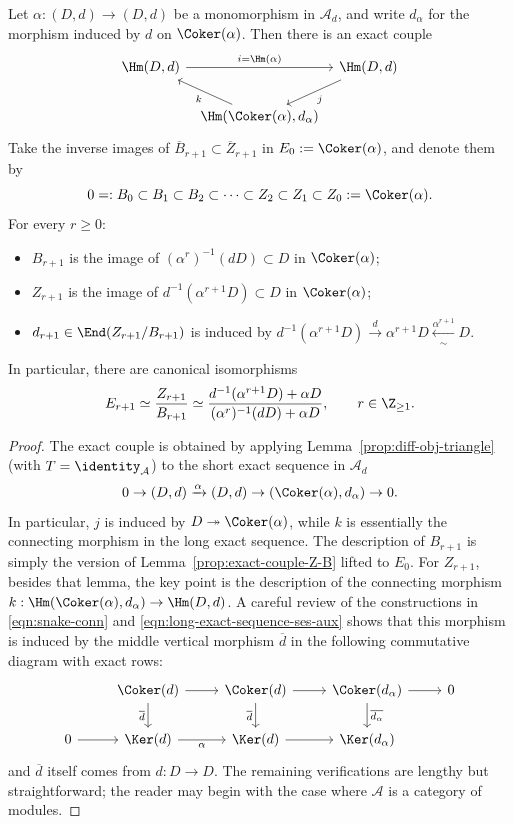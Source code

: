 \begin{proposition}\label{prop:differential-exact-couple}
	Let $\alpha:(D,d)\to(D,d)$ be a monomorphism in $\mathcal{A}_d$, and
	write $d_\alpha$ for the morphism induced by $d$ on $\Coker(\alpha)$. Then
	there is an exact couple
	\[\begin{tikzcd}[column sep=tiny]
		\Hm(D,d) \arrow[rr, "{i=\Hm(\alpha)}"] & &
		\Hm(D,d) \arrow[ld, "j"] \\
		& \Hm(\Coker(\alpha),d_\alpha) \arrow[lu, "k"] &
	\end{tikzcd}\]
	Take the inverse images of
	$\overline{B}_{r+1}\subset\overline{Z}_{r+1}$ in
	$E_0:=\Coker(\alpha)$, and denote them by
	\[ 0=:B_0\subset B_1\subset B_2\subset\cdots\subset Z_2\subset Z_1
	\subset Z_0:=\Coker(\alpha). \]
	For every $r\geq0$:
	\begin{itemize}
		\item $B_{r+1}$ is the image of
		$(\alpha^r)^{-1}(dD)\subset D$ in $\Coker(\alpha)$;
		\item $Z_{r+1}$ is the image of
		$d^{-1}(\alpha^{r+1}D)\subset D$ in $\Coker(\alpha)$;
		\item $d_{r+1}\in\End(Z_{r+1}/B_{r+1})$ is induced by
		$d^{-1}(\alpha^{r+1}D)\xrightarrow{d}\alpha^{r+1}D
		\xleftarrow[\sim]{\alpha^{r+1}}D$.
	\end{itemize}
	In particular, there are canonical isomorphisms
	\[ E_{r+1}\simeq\dfrac{Z_{r+1}}{B_{r+1}}
	\simeq\dfrac{d^{-1}(\alpha^{r+1}D)+\alpha D}
	{(\alpha^r)^{-1}(dD)+\alpha D},\qquad r\in\Z_{\geq1}. \]
\end{proposition}
\begin{proof}
	The exact couple is obtained by applying
	Lemma~\ref{prop:diff-obj-triangle} (with
	$T=\identity_{\mathcal{A}}$) to the short exact sequence in
	$\mathcal{A}_d$
	\[ 0\to(D,d)\xrightarrow{\alpha}(D,d)
	\to(\Coker(\alpha),d_\alpha)\to0. \]
	In particular, $j$ is induced by $D\twoheadrightarrow\Coker(\alpha)$,
	while $k$ is essentially the connecting morphism in the long exact
	sequence. The description of $B_{r+1}$ is simply the version of
	Lemma~\ref{prop:exact-couple-Z-B} lifted to $E_0$. For $Z_{r+1}$, besides
	that lemma, the key point is the description of the connecting morphism
	$k:\Hm(\Coker(\alpha),d_\alpha)\to\Hm(D,d)$. A careful review of the
	constructions in \eqref{eqn:snake-conn} and
	\eqref{eqn:long-exact-sequence-ses-aux} shows that this morphism is induced
	by the middle vertical morphism $\overline{d}$ in the following commutative
	diagram with exact rows:
	\[\begin{tikzcd}
		& \Coker(d) \arrow[r] \arrow[d, "\overline{d}"'] &
		\Coker(d) \arrow[r] \arrow[d, "\overline{d}"'] &
		\Coker(d_\alpha) \arrow[d, "\overline{d_\alpha}"] \arrow[r] & 0 \\
		0 \arrow[r] & \Ker(d) \arrow[r, "\alpha"'] &
		\Ker(d) \arrow[r] & \Ker(d_\alpha) &
	\end{tikzcd}\]
	and $\overline{d}$ itself comes from $d:D\to D$. The remaining
	verifications are lengthy but straightforward; the reader may begin with
	the case where $\mathcal{A}$ is a category of modules.
\end{proof}

